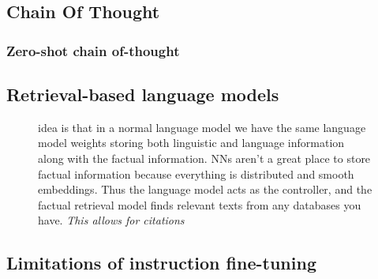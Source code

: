\documentclass[11pt]{article}
\begin{document}
\subsection{Chain Of Thought}

\begin{figure}[H]
    \centering
\end{figure}

\subsubsection{Zero-shot chain of-thought}

\begin{figure}[H]
    \centering
\end{figure}   

\subsection{Retrieval-based language models}

\begin{figure}[H]
    \centering
    \caption*{idea is that in a normal language model we have the same language model weights storing both linguistic and language information along with the factual information. NNs aren't a great place to store factual information because everything is distributed and smooth embeddings. Thus the language model acts as the controller, and the factual retrieval model finds relevant texts from any databases you have. \emph{This allows for citations}}
\end{figure}

\subsection{Limitations of instruction fine-tuning}
\end{document}
